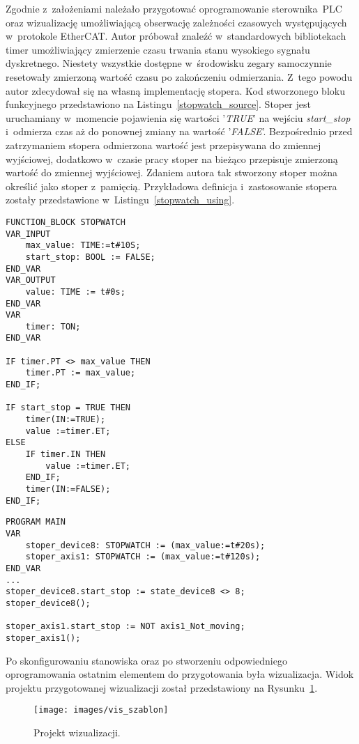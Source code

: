 Zgodnie z~założeniami należało przygotować oprogramowanie sterownika~PLC oraz wizualizację umożliwiającą obserwację zależności czasowych występujących w~protokole EtherCAT. Autor próbował znaleźć w~standardowych bibliotekach timer umożliwiający zmierzenie czasu trwania stanu wysokiego sygnału dyskretnego. Niestety wszystkie dostępne w~środowisku zegary samoczynnie resetowały zmierzoną wartość czasu po zakończeniu odmierzania. Z~tego powodu autor zdecydował się na własną implementację stopera. Kod stworzonego bloku funkcyjnego przedstawiono na Listingu~\ref{stopwatch_source}. Stoper jest uruchamiany w~momencie pojawienia się wartości '\textit{TRUE}' na wejściu \textit{start\_stop} i~odmierza czas aż do ponownej zmiany na wartość '\textit{FALSE}'. Bezpośrednio przed zatrzymaniem stopera odmierzona wartość jest przepisywana do zmiennej wyjściowej, dodatkowo w~czasie pracy stoper na bieżąco przepisuje zmierzoną wartość do zmiennej wyjściowej. Zdaniem autora tak stworzony stoper można określić jako stoper z~pamięcią. Przykładowa definicja i~zastosowanie stopera zostały przedstawione w~Listingu~\ref{stopwatch_using}.
\clearpage
\begin{lstlisting}[caption={Kod źródłowy stopera.},label=stopwatch_source]
FUNCTION_BLOCK STOPWATCH
VAR_INPUT
	max_value: TIME:=t#10S;
	start_stop: BOOL := FALSE;
END_VAR
VAR_OUTPUT
	value: TIME := t#0s;
END_VAR
VAR
	timer: TON;
END_VAR

IF timer.PT <> max_value THEN
	timer.PT := max_value;
END_IF;

IF start_stop = TRUE THEN
	timer(IN:=TRUE);
	value :=timer.ET;
ELSE
	IF timer.IN THEN
		value :=timer.ET;
	END_IF;
	timer(IN:=FALSE);
END_IF;
\end{lstlisting}

\begin{lstlisting}[caption={Wywołania odmierzania czasu stworzonym \\ blokiem funkcyjnym \textit{STOPWATCH}.},label=stopwatch_using]
PROGRAM MAIN
VAR
	stoper_device8: STOPWATCH := (max_value:=t#20s);
	stoper_axis1: STOPWATCH := (max_value:=t#120s);
END_VAR	
...
stoper_device8.start_stop := state_device8 <> 8;
stoper_device8();

stoper_axis1.start_stop := NOT axis1_Not_moving;
stoper_axis1();
\end{lstlisting}

Po skonfigurowaniu stanowiska oraz po stworzeniu odpowiedniego oprogramowania ostatnim elementem do przygotowania była wizualizacja. Widok projektu przygotowanej wizualizacji został przedstawiony na Rysunku~\ref{vis_szablon}.
\begin{figure}[!htb] 	\centering 	\texttt{[image: images/vis\_szablon]} \caption{Projekt wizualizacji.} \label{vis_szablon} \end{figure}

